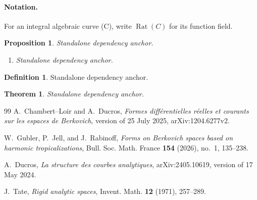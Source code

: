 \documentclass[11pt]{article}
\newtheorem{proposition}[lemma]{Proposition}
\newtheorem{theorem}[lemma]{Theorem}
\theoremstyle{definition}
\newtheorem{definition}[lemma]{Definition}
\theoremstyle{remark}
\begin{document}
\paragraph{Notation.}
For an integral algebraic curve (C), write
\(\operatorname{Rat}(C)\) for its function field.

















\begin{proposition}
\label{prop:ch13-pullback-properties}
Standalone dependency anchor.
\begin{enumerate}
\item\label{itm:ch13-pb:red}Standalone dependency anchor.
\end{enumerate}
\end{proposition}
\begin{definition}
\label{def:ch16-psh-filtration}
Standalone dependency anchor.
\end{definition}
\begin{theorem}
\label{thm:current-fundamental-cycle}
Standalone dependency anchor.
\end{theorem}

\begin{thebibliography}{99}
A.~Chambert--Loir and A.~Ducros,
\emph{Formes diff\'erentielles r\'eelles et courants sur les espaces de
Berkovich}, version of 25 July 2025, arXiv:1204.6277v2.

W.~Gubler, P.~Jell, and J.~Rabinoff,
\emph{Forms on Berkovich spaces based on harmonic tropicalizations},
Bull. Soc. Math. France \textbf{154} (2026), no.~1, 135--238.

A.~Ducros,
\emph{La structure des courbes analytiques},
arXiv:2405.10619, version of 17 May 2024.

J.~Tate,
\emph{Rigid analytic spaces},
Invent. Math. \textbf{12} (1971), 257--289.
\end{thebibliography}
\end{document}
